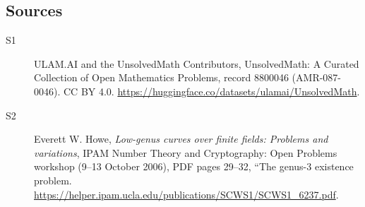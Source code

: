 \documentclass[11pt]{article}
\begin{document}
\subsection{Sources}
\begin{description}
\item[\hypertarget{source:8800046:1}{S1}] ULAM.AI and the UnsolvedMath Contributors, UnsolvedMath: A Curated Collection of Open Mathematics Problems, record 8800046 (AMR-087-0046). CC BY 4.0. \url{https://huggingface.co/datasets/ulamai/UnsolvedMath}.
\item[\hypertarget{source:8800046:2}{S2}] Everett W. Howe, \emph{Low-genus curves over finite fields: Problems and variations}, IPAM Number Theory and Cryptography: Open Problems workshop (9--13 October 2006), PDF pages 29--32, ``The genus-3 existence problem. \url{https://helper.ipam.ucla.edu/publications/SCWS1/SCWS1_6237.pdf}.
\end{description}
\label{end:8800046}
\end{document}
